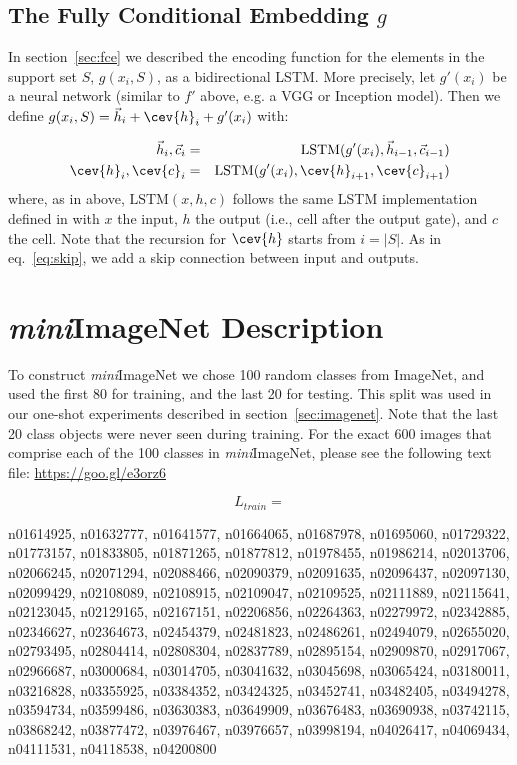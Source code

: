\subsection{The Fully Conditional Embedding \texorpdfstring{$g$}{g}}
In section~\ref{sec:fce} we described the encoding function for the elements in the support set $S$, $g(x_i, S)$, as a bidirectional LSTM. More precisely, let $g'(x_i)$ be a neural network (similar to $f'$ above, e.g. a VGG or Inception model). Then we define $g(x_i, S) = \vec{h}_i + \cev{h}_i + g'(x_i)$ with:

\begin{eqnarray*}
\vec{h}_i, \vec{c}_i &=& \text{LSTM}(g'(x_i), \vec{h}_{i-1},\vec{c}_{i-1}) \\
\cev{h}_i, \cev{c}_i &=& \text{LSTM}(g'(x_i), \cev{h}_{i+1},\cev{c}_{i+1}) \\
\end{eqnarray*}
where, as in above,  $\text{LSTM}(x,h,c)$ follows the same LSTM implementation defined in \cite{seq2seqilya} with $x$ the input, $h$ the output (i.e., cell after the output gate), and $c$ the cell. Note that the recursion for $\cev{h}$ starts from $i=|S|$. As in eq.~\ref{eq:skip}, we add a skip connection between input and outputs.

\section{\emph{mini}ImageNet Description}\label{mi_desc}
To construct \emph{mini}ImageNet we chose 100 random classes from ImageNet, and used the first 80 for training, and the last 20 for testing. This split was used in our one-shot experiments described in section~\ref{sec:imagenet}. Note that the last 20 class objects were never seen during training. For the exact 600 images that comprise each of the 100 classes in \emph{mini}ImageNet, please see the following text file: \url{https://goo.gl/e3orz6}

$$L_{train}=$${\scriptsize n01614925, n01632777, n01641577, n01664065, n01687978, n01695060, n01729322, n01773157, n01833805, n01871265, n01877812, n01978455, n01986214, n02013706, n02066245, n02071294, n02088466, n02090379, n02091635, n02096437, n02097130, n02099429, n02108089, n02108915, n02109047, n02109525, n02111889, n02115641, n02123045, n02129165, n02167151, n02206856, n02264363, n02279972, n02342885, n02346627, n02364673, n02454379, n02481823, n02486261, n02494079, n02655020, n02793495, n02804414, n02808304, n02837789, n02895154, n02909870, n02917067, n02966687, n03000684, n03014705, n03041632, n03045698, n03065424, n03180011, n03216828, n03355925, n03384352, n03424325, n03452741, n03482405, n03494278, n03594734, n03599486, n03630383, n03649909, n03676483, n03690938, n03742115, n03868242, n03877472, n03976467, n03976657, n03998194, n04026417, n04069434, n04111531, n04118538, n04200800
\par
}

